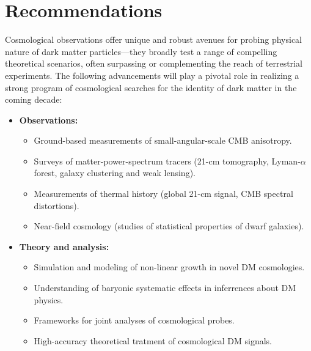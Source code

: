 \documentclass[12pt]{article}
\begin{document}
\vspace{-0.3cm}
\section{Recommendations}
\label{sec:recommendations}
\vspace{-0.2cm}
Cosmological observations offer unique and robust avenues for probing physical nature of dark matter particles---they broadly test a range of compelling theoretical scenarios, often surpassing or complementing the reach of terrestrial experiments.
The following advancements will play a pivotal role in realizing a strong program of cosmological searches for the identity of dark matter in the coming decade:
\begin{itemize}
    \item \textbf{Observations:}
    \begin{itemize}
        \item Ground-based measurements of small-angular-scale CMB anisotropy.
        \item Surveys of matter-power-spectrum tracers (21-cm tomography, Lyman-$\alpha$ forest, galaxy clustering and weak lensing).
        \item Measurements of thermal history (global 21-cm signal, CMB spectral distortions).
        \item Near-field cosmology (studies of statistical properties of dwarf galaxies).
    \end{itemize}
    \item \textbf{Theory and analysis:}
    \begin{itemize}
        \item Simulation and modeling of non-linear growth in novel DM cosmologies.
        \item Understanding of baryonic systematic effects in inferrences about DM physics.
        \item Frameworks for joint analyses of cosmological probes.
        \item High-accuracy theoretical tratment of cosmological DM signals. \end{itemize}
\end{itemize}


\end{document}
